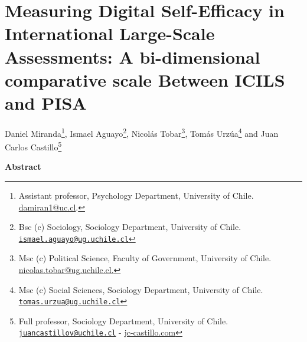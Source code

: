 \documentclass[
  letterpaper,
  DIV=11,
  numbers=noendperiod]{scrartcl}
\author{}
\date{}
\begin{document}
\section*{Measuring Digital Self-Efficacy in International Large-Scale
Assessments: A bi-dimensional comparative scale Between ICILS and
PISA}\label{measuring-digital-self-efficacy-in-international-large-scale-assessments-a-bi-dimensional-comparative-scale-between-icils-and-pisa}

Daniel Miranda\footnote{Assistant professor, Psychology Department,
  University of Chile.
  \href{mailto:danmiranda@uchile.cl}{damiran1@uc.cl}.}, Ismael
Aguayo\footnote{Bsc (c) Sociology, Sociology Department, University of
  Chile.
  \href{mailto:ismael.aguayo@ug.uchile.cl}{\nolinkurl{ismael.aguayo@ug.uchile.cl}}},
Nicolás Tobar\footnote{Msc (c) Political Science, Faculty of Government,
  University of Chile.
  \href{mailto:nicolas.tobar@ug.uchile.cl}{nicolas.tobar@ug.uchile.cl.}},
Tomás Urzúa\footnote{Msc (c) Social Sciences, Sociology Department,
  University of Chile.
  \href{mailto:tomas.urzua@ug.uchile.cl}{\nolinkurl{tomas.urzua@ug.uchile.cl}}}
and Juan Carlos Castillo\footnote{Full professor, Sociology Department,
  University of Chile.
  \href{mailto:juancastillov@uchile.cl}{\nolinkurl{juancastillov@uchile.cl}}
  - \url{jc-castillo.com}}

\textbf{Abstract}
\end{document}
